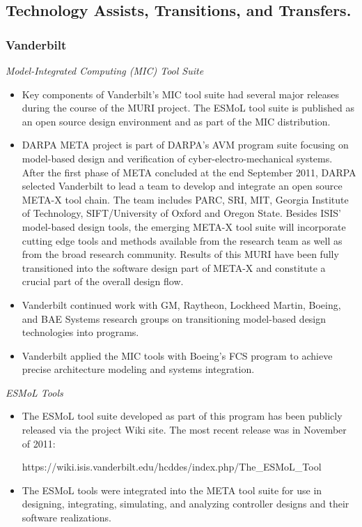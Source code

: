 \subsection{Technology Assists, Transitions, and Transfers.}

\subsubsection{Vanderbilt}

\emph{Model-Integrated Computing (MIC) Tool Suite}

\begin{itemize}
\item Key components of Vanderbilt's MIC tool suite had several major releases during the course of the MURI project.  The ESMoL tool suite is published as an open source design environment and as part of the MIC distribution.
\item DARPA META project is part of DARPA's AVM program suite focusing on model-based design and verification of cyber-electro-mechanical systems.
After the first phase of META concluded at the end September 2011, DARPA selected Vanderbilt to lead a team  to develop and integrate  an open source META-X tool chain. The team includes PARC, SRI, MIT, Georgia Institute of Technology, SIFT/University of Oxford and Oregon State. Besides ISIS’ model-based design tools, the emerging META-X tool suite will incorporate cutting edge  tools and methods available from the research team as well as from the broad research community.  Results of this MURI have been fully transitioned into the software design part of META-X and constitute a crucial part of the overall design flow. 
\item Vanderbilt continued work with GM, Raytheon, Lockheed Martin, Boeing, and BAE Systems research groups on transitioning model-based design technologies into programs.
\item Vanderbilt applied the MIC tools with Boeing's FCS program to achieve precise architecture modeling and systems integration.
\end{itemize}

\emph{ESMoL Tools}

\begin{itemize}
\item The ESMoL tool suite developed as part of this program has been publicly released via the project Wiki site.  The most recent release was in November of 2011:

https://wiki.isis.vanderbilt.edu/hcddes/index.php/The\_ESMoL\_Tool

\item The ESMoL tools were integrated into the META tool suite for use in designing, integrating, simulating, and analyzing controller designs and their software realizations.
\end{itemize}

